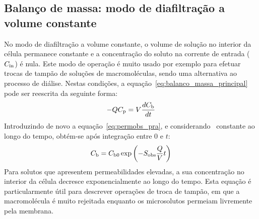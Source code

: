 \subsection{Balanço de massa: modo de diafiltração a volume constante} %
\label{sub:mod_df}
No modo de diafiltração a volume constante, o volume de solução no interior da célula permanece constante e a concentração do soluto na corrente de entrada ($C_{\mathrm{in}}$) é nula. Este modo de operação é muito usado por exemplo para efetuar trocas de tampão de soluções de macromoléculas, sendo uma alternativa ao processo de diálise. Nestas condições, a equação~\ref{eq:balanco_massa_principal} pode ser reescrita da seguinte forma:
\begin{equation}
	\label{eq:bal_mas_df_ini}
	-QC_{\mathrm{p}}=V \frac{dC_{\mathrm{b}}}{dt}
\end{equation}
Introduzindo de novo a equação~\ref{eq:permobs_pra}, e considerando \permobs\ constante ao longo do tempo, obtém-se após integração entre 0 e $t$:
\begin{equation}
	\label{bal_mas_df_final}
	C_{\mathrm{b}}=C_{\mathrm{b0}}\exp \left( -S_{\mathrm{obs}} \frac{Q}{V} t \right)
\end{equation}
Para solutos que apresentem permeabilidades elevadas, a sua concentração no interior da célula decresce exponencialmente ao longo do tempo. Esta equação é particularmente útil para descrever operações de troca de tampão, em que a macromolécula é muito rejeitada enquanto os microsolutos permeiam livremente pela membrana.


